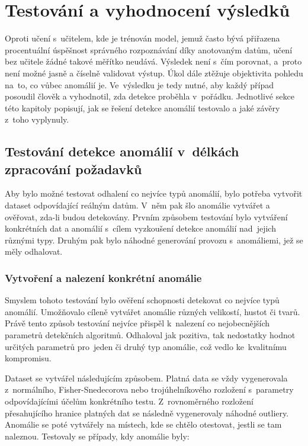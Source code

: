 \chapter{Testování a vyhodnocení výsledků}
\label{testovani-a-vyhodnoceni}

Oproti učení s~učitelem, kde je trénován model, jemuž často bývá přiřazena procentuální úspěšnost správného rozpoznávání díky anotovaným datům, učení bez učitele žádné takové měřítko neudává. Výsledek není s~čím porovnat, a~proto není možné jasně a číselně validovat výstup. Úkol dále ztěžuje objektivita pohledu na~to, co vůbec anomálií je. Ve~výsledku je tedy nutné, aby každý případ posoudil člověk a vyhodnotil, zda detekce proběhla v~pořádku. Jednotlivé sekce této kapitoly popisují, jak se řešení detekce anomálií testovalo a jaké závěry z~toho vyplynuly.

\section{Testování detekce anomálií v~délkách zpracování požadavků}
\label{testovani-delka-pozadavku}
Aby bylo možné testovat odhalení co nejvíce typů anomálií, bylo potřeba vytvořit dataset odpovídající reálným datům. V~něm pak šlo anomálie vytvářet a ověřovat, zda-li budou detekovány. Prvním způsobem testování bylo vytváření konkrétních dat a anomálií s~cílem vyzkoušení detekce anomálií nad~jejich různými typy. Druhým pak bylo náhodné generování provozu s~anomáliemi, jež se měly odhalovat.

\subsection{Vytvoření a nalezení konkrétní anomálie}
\label{testovani-konkretni-anomalie}
Smyslem tohoto testování bylo ověření schopnosti detekovat co nejvíce typů anomálií. Umožňovalo cíleně vytvářet anomálie různých velikostí, hustot či tvarů. Právě tento způsob testování nejvíce přispěl k~nalezení co nejobecnějších parametrů detekčních algoritmů. Odhaloval jak pozitiva, tak nedostatky hodnot určitých parametrů pro~jeden či druhý typ anomálie, což vedlo ke~kvalitnímu kompromisu.

Dataset se vytvářel následujícím způsobem. Platná data se vždy vygenerovala z~normálního, Fisher-Snedecorova nebo trojúhelníkového rozložení s~parametry odpovídajícími účelům konkrétního testu. Z~rovnoměrného rozložení přesahujícího hranice platných dat se následně vygenerovaly náhodné outliery. Anomálie se poté vytvářely na místech, kde se chtělo otestovat, jestli se tam naleznou. Testovaly se případy, kdy anomálie byly:

